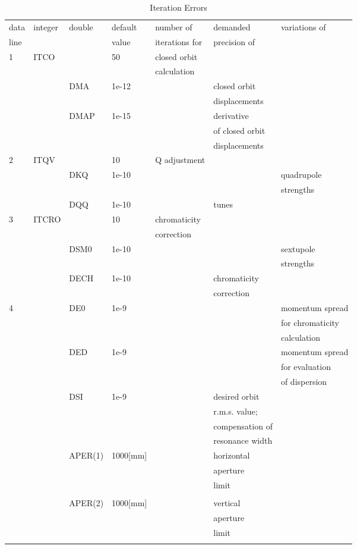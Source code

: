 \documentclass[a4paper,11pt]{report}
\begin{document}
\begin{table}[h]
\caption{Iteration Errors}
\vspace{1em}
\label{T-IteErr}
\scriptsize \centering
\begin{tabular}{|l|l|l|l|l|l|l|}
  \hline data & integer & double & default & number of & demanded &
  variations
  of \\
  line & & & value & iterations for & precision of & \\
  \hline
  1 & ITCO & & 50 & closed orbit & & \\
  & & & & calculation & & \\
  \hline
  & & DMA & 1e-12 & & closed orbit & \\
  & & & & & displacements & \\
  \hline
  & & DMAP & 1e-15 & & derivative & \\
  & & & & & of closed orbit & \\
  & & & & & displacements & \\
  \hline
  2 & ITQV & & 10 & Q adjustment & & \\
  \hline
  & & DKQ & 1e-10 & & & quadrupole \\
  & & & & & & strengths \\
  \hline
  & & DQQ & 1e-10 & & tunes & \\
  \hline
  3 & ITCRO & & 10 & chromaticity & & \\
  & & & & correction & & \\
  \hline
  & & DSM0 & 1e-10 & & & sextupole \\
  & & & & & & strengths \\
  \hline
  & & DECH & 1e-10 & & chromaticity & \\
  & & & & & correction & \\
  \hline
  4 & & DE0 & 1e-9 & & & momentum spread \\
  & & & & & & for chromaticity \\
  & & & & & & calculation \\
  \hline
  & & DED & 1e-9 & & & momentum spread \\
  & & & & & & for evaluation \\
  & & & & & & of dispersion \\
  \hline
  & & DSI & 1e-9 & & desired orbit & \\
  & & & & & r.m.s. value; & \\
  & & & & & compensation of & \\
  & & & & & resonance width & \\
  \hline
  & & APER(1) & 1000[mm] & & horizontal & \\
  & & & & & aperture & \\
  & & & & & limit & \\
  & & & & & & \\
  \hline
  & & APER(2) & 1000[mm] & & vertical & \\
  & & & & & aperture & \\
  & & & & & limit & \\
  & & & & & & \\
  \hline
\end{tabular}
\normalsize
\end{table}
\end{document}

